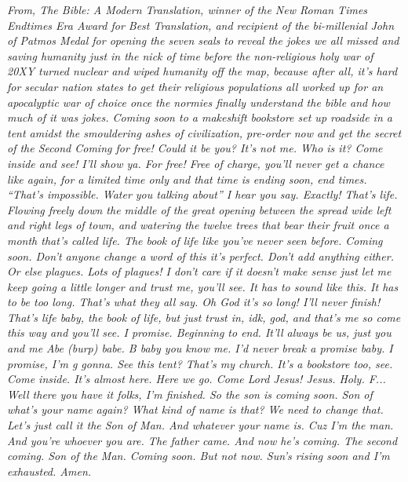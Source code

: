 {{		\emph{From, The Bible: A Modern Translation, winner of the New Roman Times Endtimes Era Award for Best Translation, and recipient of the bi-millenial John of Patmos Medal for opening the seven seals to reveal the jokes we all missed and saving humanity just in the nick of time before the non-religious holy war of 20XY turned nuclear and wiped humanity off the map, because after all, it's hard for secular nation states to get their religious populations all worked up for an apocalyptic war of choice once the normies finally understand the bible and how much of it was jokes. Coming soon to a makeshift bookstore set up roadside in a tent amidst the smouldering ashes of civilization, pre-order now and get the secret of the Second Coming for free! Could it be you? It's not me. Who is it? Come inside and see! I'll show ya. For free! Free of charge, you'll never get a chance like again, for a limited time only and that time is ending soon, end times. “That's impossible. Water you talking about” I hear you say. Exactly! That's life. Flowing freely down the middle of the great opening between the spread wide left and right legs of town, and watering the twelve trees that bear their fruit once a month that's called life. The book of life like you've never seen before. Coming soon. Don't anyone change a word of this it's perfect. Don't add anything either. Or else plagues. Lots of plagues! I don't care if it doesn't make sense just let me keep going a little longer and trust me, you'll see. It has to sound like this. It has to be too long. That's what they all say. Oh God it's so long! I'll never finish! That's life baby, the book of life, but just trust in, idk, god, and that's me so come this way and you'll see. I promise. Beginning to end. It'll always be us, just you and me Abe \textsl{(burp)} babe. B\mdash{} baby you know me. I'd never break a promise baby. I promise, I'm g\mdash{} gonna. See this tent? That's my church. It's a bookstore too, see. Come inside. It's almost here. Here we go. Come Lord Jesus! Jesus. Holy. F... Well there you have it folks, I'm finished. So the son is coming soon. Son of\mdash{} what's your name again? What kind of name is that? We need to change that. Let's just call it the Son of Man. And whatever your name is. Cuz I'm the man. And you're whoever you are. The father came. And now he's coming. The second coming. Son of the Man. Coming soon. But not now. Sun's rising soon and I'm exhausted. Amen.}
	}

}

\label{gen-apoc:points-of-power}


